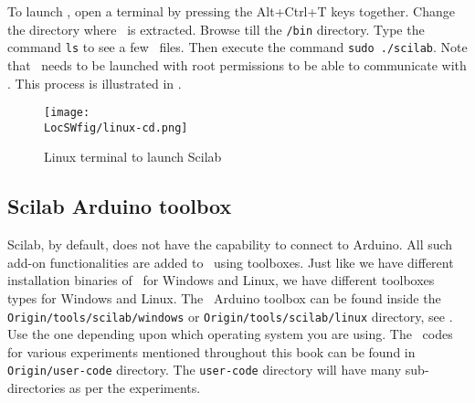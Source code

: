 To launch \scilab, open a terminal by pressing the Alt+Ctrl+T keys
together. Change the directory where \scilab\ is extracted. Browse
till the {\tt /bin} directory. Type the command {\tt ls} to see a few
\scilab\ files.  Then execute the command {\tt sudo ./scilab}. Note
that \scilab\ needs to be launched with root permissions to be able to
communicate with \arduino. This process is illustrated in
.
\begin{figure}
      \centering
      \texttt{[image: \\LocSWfig/linux-cd.png]}
      \caption{Linux terminal to launch Scilab}
      \label{linux-cd}
\end{figure}

\subsection{Scilab Arduino toolbox}
Scilab, by default, does not have the capability to connect to
Arduino. All such add-on functionalities are added to \scilab\ using
toolboxes. Just like we have different installation binaries of
\scilab\ for Windows and Linux, we have different toolboxes types for
Windows and Linux. The \scilab\ Arduino toolbox can be found inside
the {\tt Origin/tools/scilab/windows} or {\tt Origin/tools/scilab/linux} directory,
see .  Use the one depending upon
which operating system you are using. The \scilab\ codes for various
experiments mentioned throughout this book can be found in {\tt
            Origin/user-code} directory. The {\tt user-code} directory will have
many sub-directories as per the experiments.

